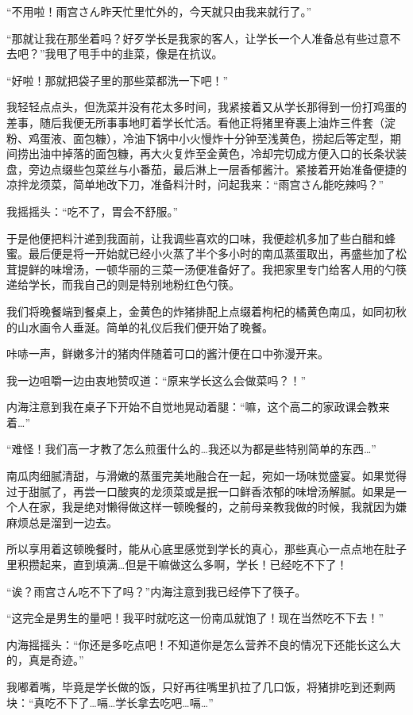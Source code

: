 “不用啦！雨宫さん昨天忙里忙外的，今天就只由我来就行了。”

“那就让我在那坐着吗？好歹学长是我家的客人，让学长一个人准备总有些过意不去吧？”我甩了甩手中的韭菜，像是在抗议。

“好啦！那就把袋子里的那些菜都洗一下吧！”

我轻轻点点头，但洗菜并没有花太多时间，我紧接着又从学长那得到一份打鸡蛋的差事，随后我便无所事事地盯着学长忙活。看他正将猪里脊裹上油炸三件套（淀粉、鸡蛋液、面包糠），冷油下锅中小火慢炸十分钟至浅黄色，捞起后等定型，期间捞出油中掉落的面包糠，再大火复炸至金黄色，冷却完切成方便入口的长条状装盘，旁边点缀些包菜丝与小番茄，最后淋上一层香郁酱汁。紧接着开始准备便捷的凉拌龙须菜，简单地改下刀，准备料汁时，问起我来：“雨宫さん能吃辣吗？”

我摇摇头：“吃不了，胃会不舒服。”

于是他便把料汁递到我面前，让我调些喜欢的口味，我便趁机多加了些白醋和蜂蜜。最后便是将一开始就已经小火蒸了半个多小时的南瓜蒸蛋取出，再盛些加了松茸提鲜的味增汤，一顿华丽的三菜一汤便准备好了。我把家里专门给客人用的勺筷递给学长，而我自己的则是特别地粉红色勺筷。

我们将晚餐端到餐桌上，金黄色的炸猪排配上点缀着枸杞的橘黄色南瓜，如同初秋的山水画令人垂涎。简单的礼仪后我们便开始了晚餐。

咔哧一声，鲜嫩多汁的猪肉伴随着可口的酱汁便在口中弥漫开来。

我一边咀嚼一边由衷地赞叹道：“原来学长这么会做菜吗？！”

内海注意到我在桌子下开始不自觉地晃动着腿：“嘛，这个高二的家政课会教来着…”

“难怪！我们高一才教了怎么煎蛋什么的…我还以为都是些特别简单的东西…”

南瓜肉细腻清甜，与滑嫩的蒸蛋完美地融合在一起，宛如一场味觉盛宴。如果觉得过于甜腻了，再尝一口酸爽的龙须菜或是抿一口鲜香浓郁的味增汤解腻。如果是一个人在家，我是绝对懒得做这样一顿晚餐的，之前母亲教我做的时候，我就因为嫌麻烦总是溜到一边去。

所以享用着这顿晚餐时，能从心底里感觉到学长的真心，那些真心一点点地在肚子里积攒起来，直到填满…但是干嘛做这么多啊，学长！已经吃不下了！

“诶？雨宫さん吃不下了吗？”内海注意到我已经停下了筷子。

“这完全是男生的量吧！我平时就吃这一份南瓜就饱了！现在当然吃不下去！”

内海摇摇头：“你还是多吃点吧！不知道你是怎么营养不良的情况下还能长这么大的，真是奇迹。”

我嘟着嘴，毕竟是学长做的饭，只好再往嘴里扒拉了几口饭，将猪排吃到还剩两块：“真吃不下了…嗝…学长拿去吃吧…嗝…”

